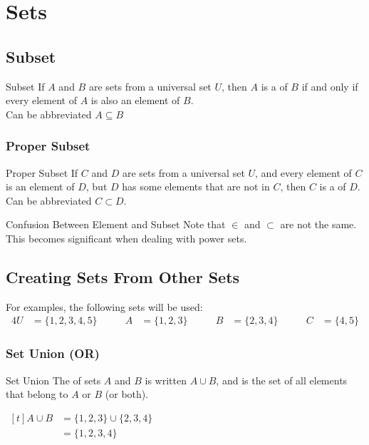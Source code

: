 \documentclass[\main/notes.tex]{subfiles}
\begin{document}
	\ifSubfilesClassLoaded{\setcounter{chapter}{2}}{}
	\chapter{Sets}
		\section{Subset}
			\begin{definition}{Subset}
				If $A$ and $B$ are sets from a universal set $U$, then $A$ is a  of $B$ if and only if every element of $A$ is also an element of $B$.\\
				Can be abbreviated $A \subseteq B$
			\end{definition}
			\subsection{Proper Subset}
				\begin{definition}{Proper Subset}
					If $C$ and $D$ are sets from a universal set $U$, and every element of $C$ is an element of $D$, but $D$ has some elements that are not in $C$, then $C$ is a  of $D$.\\
					Can be abbreviated $C \subset D$.
				\end{definition}
				\begin{sidenote}{Confusion Between Element and Subset}
					Note that $\in$ and $\subset$ are not the same. This becomes significant when dealing with power sets.
				\end{sidenote}
		\pagebreak
		\section{Creating Sets From Other Sets}
			For examples, the following sets will be used:
			\begin{alignat*}{4}
				U &= \{1, 2, 3, 4, 5\}\qquad & A &= \{1, 2, 3\} \qquad & B &= \{2, 3, 4\} \qquad & C &= \{4, 5\}
			\end{alignat*}

			\subsection[Set Union]{Set Union (OR)}
				\begin{definition}{Set Union}
					The  of sets $A$ and $B$ is written $A \cup B$, and is the set of all elements that belong to $A$ or $B$ (or both).
				\end{definition}
				\nopagebreak
				\begin{center}
					\begin{venntwo}[][$A \cup B = \bigl\{x \mid x \in A$ or $x \in B\bigr\}$]
						\fillA
						\fillB
					\end{venntwo}
				\end{center}
				\begin{example}[hbox] $
					\begin{aligned}[t]
						A \cup B &= \{1, 2, 3\} \cup \{2, 3, 4\}\\
						&= \{1, 2, 3, 4\}
					\end{aligned} $
				\end{example}
\end{document}
